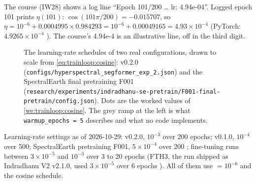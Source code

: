 \begin{sourcenote}
The course (IW28) shows a log line ``Epoch 101/200 \ldots{} lr: 4.94e-04''. Logged epoch 101
prints $\eta(101)$: $\cos(101\pi/200) = -0.015707$, so $\eta = 10^{-6} + 0.0004995 \times
0.984293 = 10^{-6} + 0.00049165 = 4.93 \times 10^{-4}$ (PyTorch: $4.9265 \times
10^{-4}$ \tagC). The course's 4.94e-4 is an illustrative line, off in the third digit.
\end{sourcenote}

\begin{figure}[htbp]
\centering
{}
\caption[The learning-rate schedules of v0.2.0 and F001]{The learning-rate schedules of two real configurations, drawn to scale from
\cref{eq:trainloop:cosine}: v0.2.0 (\texttt{configs/hyperspectral\_segformer\_exp\_2.json}) and the
SpectralEarth final pretraining F001
(\texttt{research/experiments/indradhanu-se-pretrain/F001-final-pretrain/config.json}). Dots are
the worked values of \cref{we:trainloop:cosine}. The grey ramp at the left is what
\texttt{warmup\_epochs = 5} describes and what no code implements.}
\label{fig:trainloop:cosine}
\end{figure}

\begin{drift}
Learning-rate settings as of 2026-10-29: v0.2.0, $10^{-3}$ over 200 epochs; v0.1.0, $10^{-4}$
over 500; SpectralEarth pretraining F001, $5 \times 10^{-4}$ over 200
; fine-tuning
runs between $3 \times 10^{-5}$ and $10^{-3}$ over 3 to 20 epochs (FTH3, the run shipped as
Indradhanu V2 v2.1.0, used $3 \times 10^{-5}$ over 6 epochs
). All of them
use  $= 10^{-6}$ and the cosine schedule.
\end{drift}

